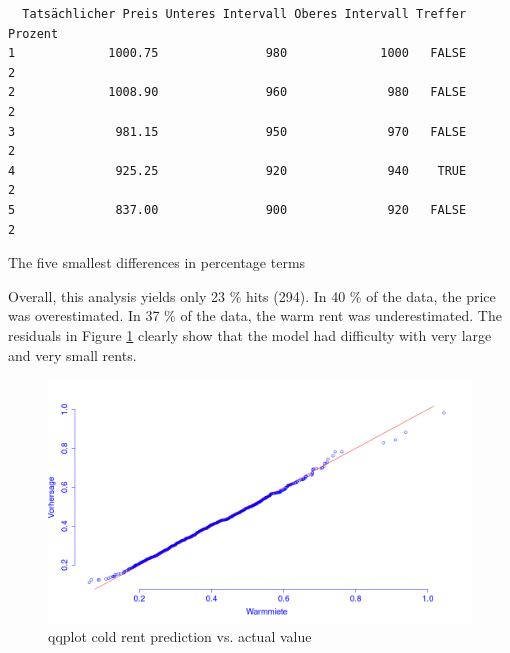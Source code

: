 \begin{table}[H]
	\begin{verbatim}
  Tatsächlicher Preis Unteres Intervall Oberes Intervall Treffer Prozent
1             1000.75               980             1000   FALSE       2
2             1008.90               960              980   FALSE       2
3              981.15               950              970   FALSE       2
4              925.25               920              940    TRUE       2
5              837.00               900              920   FALSE       2
	\end{verbatim}
	\caption{The five smallest differences in percentage terms}
	\label{tbl: top 5 relativ unten}
\end{table}

 Overall, this analysis yields only 23 \% hits (294). In 40 \% of the data, the price was overestimated. In 37 \% of the data, the warm rent was underestimated. The residuals in Figure  \ref{fig: warmmiete qq}  clearly show that the model had difficulty with very large and very small rents.
 

\begin{figure}[H]
	\centering
	\includegraphics[width=.9\linewidth]{img/warmmiete qq}
	\caption{qqplot cold rent prediction vs. actual value}
	\label{fig: warmmiete qq}
\end{figure}
